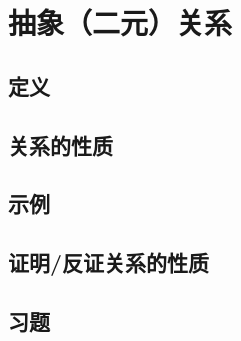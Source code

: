 \section{抽象（二元）关系}

\subsection{定义}

\subsection{关系的性质}

\subsection{示例}

\subsection{证明/反证关系的性质}

\subsection{习题}